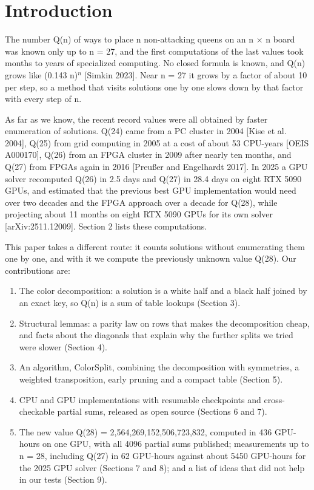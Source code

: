 \section{Introduction}

The number Q(n) of ways to place n non-attacking queens on an n × n board was known only up to n = 27, and the first computations of the last values took months to years of specialized computing. No closed formula is known, and Q(n) grows like (0.143 n)$^{n}$ [Simkin 2023]. Near n = 27 it grows by a factor of about 10 per step, so a method that visits solutions one by one slows down by that factor with every step of n.

As far as we know, the recent record values were all obtained by faster enumeration of solutions. Q(24) came from a PC cluster in 2004 [Kise et al. 2004], Q(25) from grid computing in 2005 at a cost of about 53 CPU-years [OEIS A000170], Q(26) from an FPGA cluster in 2009 after nearly ten months, and Q(27) from FPGAs again in 2016 [Preußer and Engelhardt 2017]. In 2025 a GPU solver recomputed Q(26) in 2.5 days and Q(27) in 28.4 days on eight RTX 5090 GPUs, and estimated that the previous best GPU implementation would need over two decades and the FPGA approach over a decade for Q(28), while projecting about 11 months on eight RTX 5090 GPUs for its own solver [arXiv:2511.12009]. Section 2 lists these computations.

This paper takes a different route: it counts solutions without enumerating them one by one, and with it we compute the previously unknown value Q(28). Our contributions are:

\begin{enumerate}
\item{} The color decomposition: a solution is a white half and a black half joined by an exact key, so Q(n) is a sum of table lookups (Section 3).
\item{} Structural lemmas: a parity law on rows that makes the decomposition cheap, and facts about the diagonals that explain why the further splits we tried were slower (Section 4).
\item{} An algorithm, ColorSplit, combining the decomposition with symmetries, a weighted transposition, early pruning and a compact table (Section 5).
\item{} CPU and GPU implementations with resumable checkpoints and cross-checkable partial sums, released as open source (Sections 6 and 7).
\item{} The new value Q(28) = 2,564,269,152,506,723,832, computed in 436 GPU-hours on one GPU, with all 4096 partial sums published; measurements up to n = 28, including Q(27) in 62 GPU-hours against about 5450 GPU-hours for the 2025 GPU solver (Sections 7 and 8); and a list of ideas that did not help in our tests (Section 9).
\end{enumerate}

